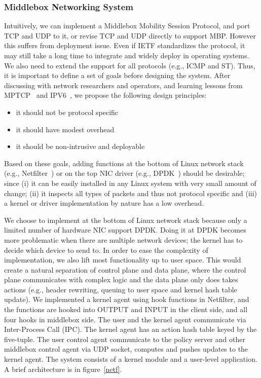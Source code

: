 \subsubsection{Middlebox Networking System} \label{kernelagent}
Intuitively, we can implement a Middlebox Mobility Session Protocol, and port TCP and UDP to it, or revise TCP and UDP directly to support MBP. However this suffers from deployment issue. Even if IETF standardizes the protocol, it may still take a long time to integrate and widely deploy in operating systems. We also need to extend the support for all protocols (e.g., ICMP and ST).  Thus, it is important to define a set of goals before designing the system. After discussing with network researchers and operators, and learning lessons from MPTCP~\cite{MPTCP} and IPV6~\cite{IPV6}, we propose the following design principles:

\begin{itemize}
\item it should not be protocol specific
\item it should have modest overhead
\item it should be non-intrusive and deployable
\end{itemize}

Based on these goals, adding functions at the bottom of Linux network stack (e.g., Netfilter~\cite{Netfilter}) or on the top NIC driver (e.g., DPDK~\cite{dpdk}) should be desirable; since (i) it can be easily installed in any Linux system with very small amount of change; (ii) it inspects all types of packets and thus not protocol specific and (iii) a kernel or driver implementation by nature has a low overhead. 


We choose to implement at the bottom of Linux network stack because only a limited number of hardware NIC support DPDK. Doing it at DPDK becomes more problematic when there are multiple network devices; the kernel has to decide which device to send to. 
In order to ease the complexity of implementation, we also lift most functionality up to user space. This would create a natural separation of control plane and data plane, where the control plane communicates with complex logic and the data plane only does takes actions (e.g., header rewriting, queuing to user space and kernel hash table update). We implemented a kernel agent using hook functions in Netfilter, and the functions are hooked into OUTPUT and INPUT in the client side, and all four hooks in middlebox side. The user and the kernel agent communicate via Inter-Process Call (IPC). The kernel agent has an action hash table keyed by the five-tuple. The user control agent communicate to the policy server and other middlebox control agent via UDP socket, computes and pushes updates to the kernel agent. The system consists of a kernel module and a user-level application. A brief architecture is in figure~\ref{netf}.

